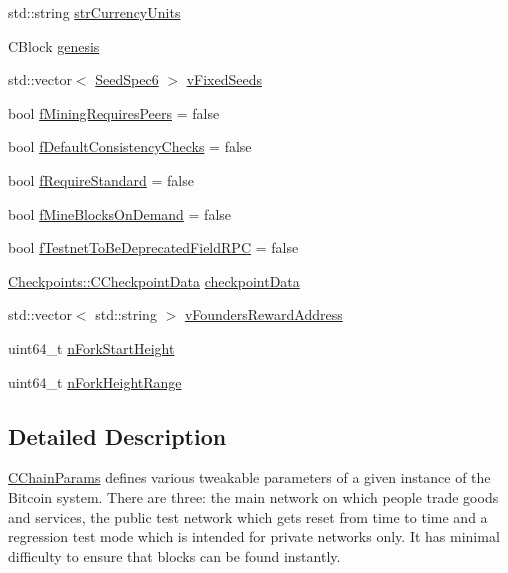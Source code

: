 \begin{DoxyCompactItemize}
\item 
std\+::string \mbox{\hyperlink{class_c_chain_params_aa6720c0b8eec741d343c9ee0c3c095b3}{str\+Currency\+Units}}
\item 
C\+Block \mbox{\hyperlink{class_c_chain_params_a2e4119fa75f6ea0c64ba8809dab5c4f8}{genesis}}
\item 
std\+::vector$<$ \mbox{\hyperlink{struct_seed_spec6}{Seed\+Spec6}} $>$ \mbox{\hyperlink{class_c_chain_params_a6853ff4c88ca3df1d864a8d72153614d}{v\+Fixed\+Seeds}}
\item 
bool \mbox{\hyperlink{class_c_chain_params_abe9980263561e3f26b6352daa64092da}{f\+Mining\+Requires\+Peers}} = false
\item 
bool \mbox{\hyperlink{class_c_chain_params_a630f023ae4a95a8b420bad0a08b4428c}{f\+Default\+Consistency\+Checks}} = false
\item 
bool \mbox{\hyperlink{class_c_chain_params_abc615d2750d847e1eac0ecb7fc8d2da8}{f\+Require\+Standard}} = false
\item 
bool \mbox{\hyperlink{class_c_chain_params_ad640045ea40c569df7b826551872e1bd}{f\+Mine\+Blocks\+On\+Demand}} = false
\item 
bool \mbox{\hyperlink{class_c_chain_params_a4f62f1b7070f83b48aa86564628a2e7d}{f\+Testnet\+To\+Be\+Deprecated\+Field\+R\+PC}} = false
\item 
\mbox{\hyperlink{struct_checkpoints_1_1_c_checkpoint_data}{Checkpoints\+::\+C\+Checkpoint\+Data}} \mbox{\hyperlink{class_c_chain_params_ac66ed599d7795bd17a504539a960f9de}{checkpoint\+Data}}
\item 
std\+::vector$<$ std\+::string $>$ \mbox{\hyperlink{class_c_chain_params_a54c46bc5f678eda307507f3c4310361b}{v\+Founders\+Reward\+Address}}
\item 
uint64\+\_\+t \mbox{\hyperlink{class_c_chain_params_ae06e698dde75edddbe9b0fef0a97102c}{n\+Fork\+Start\+Height}}
\item 
uint64\+\_\+t \mbox{\hyperlink{class_c_chain_params_a12ee49b1c7b52913c0937dbccb93bd4e}{n\+Fork\+Height\+Range}}
\end{DoxyCompactItemize}


\subsection{Detailed Description}
\mbox{\hyperlink{class_c_chain_params}{C\+Chain\+Params}} defines various tweakable parameters of a given instance of the Bitcoin system. There are three\+: the main network on which people trade goods and services, the public test network which gets reset from time to time and a regression test mode which is intended for private networks only. It has minimal difficulty to ensure that blocks can be found instantly. 

